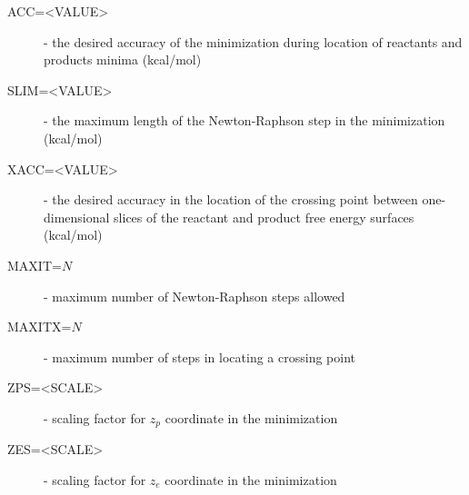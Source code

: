 \documentclass[oneside,11pt,openany]{book}
\newcommand{\tw}{\ttfamily}
\begin{document}
\begin{description}
\item[{\tw ACC=<VALUE>}] - the desired accuracy of the minimization
	      during location of reactants and products
	      minima (kcal/mol)

\item[{\tw SLIM=<VALUE>}] - the maximum length of the Newton-Raphson step
	       in the minimization (kcal/mol)

\item[{\tw XACC=<VALUE>}] - the desired accuracy in the location
	       of the crossing point between one-dimensional
	       slices of the reactant and product free
	       energy surfaces (kcal/mol)

\item[{\tw MAXIT=$N$}] - maximum number of Newton-Raphson steps allowed

\item[{\tw MAXITX=$N$}] - maximum number of steps in locating a crossing point

\item[{\tw ZPS=<SCALE>}] - scaling factor for $z_p$ coordinate in the
                           minimization

\item[{\tw ZES=<SCALE>}] - scaling factor for $z_e$ coordinate in the
                           minimization
%
\end{description}
\end{document}
